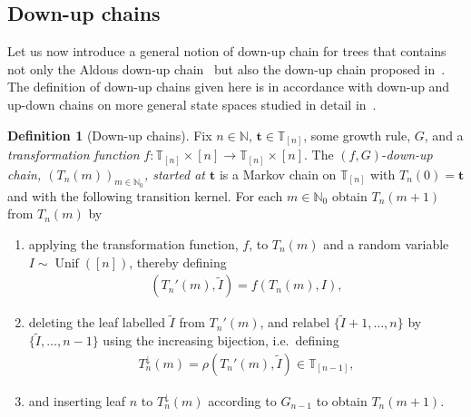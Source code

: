 \documentclass[a4paper, final]{amsart}
\theoremstyle{plain}
\theoremstyle{definition}
\newtheorem{defi}[thm]{Definition}
\newcommand{\tree}[1][t]{\boldsymbol{#1}}
\newcommand{\T}{\mathbb{T}}
\newcommand{\N}{\mathbb{N}}
\DeclareMathOperator{\Unif}{Unif}
\begin{document}
\subsection{Down-up chains}%
\label{sec:downupchains}
%
Let us now introduce a general notion of down-up chain for trees that contains not only the Aldous down-up chain~\cite{RefWorks:doc:5b4cbc14e4b04428cc72cf41} but also the down-up chain proposed in~\cite{RefWorks:doc:5b4cbc93e4b07f5746e47014}.
The definition of down-up chains given here is in accordance with down-up and up-down chains on more general state spaces studied in detail in~\cite{MR2480792,MR2095623,MR2480787,MR2596654}.
%
\begin{defi}[Down-up chains]\label{downupchain_general}
  Fix $n \in \N$, $\tree \in \T_{[n]}$, some growth rule, $G$, and a \textit{transformation function} $f \colon \T_{[n]} \times [n] \to \T_{[n]} \times [n]$.
  The $(f, G)$-\textit{down-up chain, ${\left( T_n(m) \right)}_{m \in \N_0}$,  started at $\tree$} is a Markov chain on $\T_{[n]}$ with $T_n(0) = \tree$ and with the following transition kernel.
  For each $m \in \N_0$ obtain $T_n(m+1)$ from $T_n(m)$ by
  \begin{enumerate}
    \item\label{transformation_down} applying the transformation function, $f$, to $T_n(m)$ and a random variable $I \sim \Unif\left( [n] \right)$, thereby defining
      \begin{align*}
        \left( T_n'(m), \tilde{I} \right)
        = f \left( T_n(m), I \right),
      \end{align*}
    \item\label{delete_relabel} deleting the leaf labelled $\tilde{I}$ from $T_n'(m)$, and relabel $\{\tilde{I} + 1, \ldots, n\}$ by $\{\tilde{I}, \ldots, n-1\}$ using the increasing bijection, i.e.\ defining
      \begin{align*}
        T_n^\downarrow(m)
        = \rho\left( T_n'(m), \tilde{I} \right) \in \T_{[n-1]},
      \end{align*}
    \item\label{insertion} and inserting leaf $n$ to $T_n^{\downarrow}(m)$ according to $G_{n-1}$ to obtain $T_n(m+1)$.
  \end{enumerate}

\end{defi}
\end{document}
